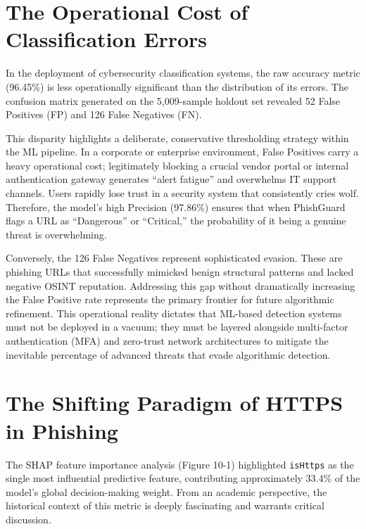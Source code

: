 \section{The Operational Cost of Classification
Errors}\label{the-operational-cost-of-classification-errors}

In the deployment of cybersecurity classification systems, the raw
accuracy metric (96.45\%) is less operationally significant than the
distribution of its errors. The confusion matrix generated on the
5,009-sample holdout set revealed 52 False Positives (FP) and 126 False
Negatives (FN).

This disparity highlights a deliberate, conservative thresholding
strategy within the ML pipeline. In a corporate or enterprise
environment, False Positives carry a heavy operational cost;
legitimately blocking a crucial vendor portal or internal authentication
gateway generates ``alert fatigue'' and overwhelms IT support channels.
Users rapidly lose trust in a security system that consistently cries
wolf. Therefore, the model's high Precision (97.86\%) ensures that when
PhishGuard flags a URL as ``Dangerous'' or ``Critical,'' the probability
of it being a genuine threat is overwhelming.

Conversely, the 126 False Negatives represent sophisticated evasion.
These are phishing URLs that successfully mimicked benign structural
patterns and lacked negative OSINT reputation. Addressing this gap
without dramatically increasing the False Positive rate represents the
primary frontier for future algorithmic refinement. This operational
reality dictates that ML-based detection systems must not be deployed in
a vacuum; they must be layered alongside multi-factor authentication
(MFA) and zero-trust network architectures to mitigate the inevitable
percentage of advanced threats that evade algorithmic detection.

\section{The Shifting Paradigm of HTTPS in
Phishing}\label{the-shifting-paradigm-of-https-in-phishing}

The SHAP feature importance analysis (Figure 10-1) highlighted
\texttt{isHttps} as the single most influential predictive feature,
contributing approximately 33.4\% of the model's global decision-making
weight. From an academic perspective, the historical context of this
metric is deeply fascinating and warrants critical discussion.

